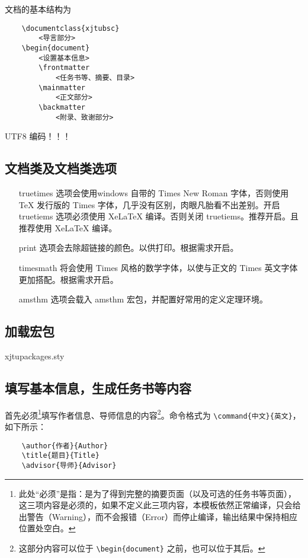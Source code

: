 \documentclass[%
               amsthm,
              ]{xjtubsc}
\begin{document}
文档的基本结构为
\begin{verbatim}
    \documentclass{xjtubsc}
        <导言部分>
    \begin{document}
        <设置基本信息>
        \frontmatter
            <任务书等、摘要、目录>
        \mainmatter
            <正文部分>
        \backmatter
            <附录、致谢部分>
\end{verbatim}

UTF8 编码！！！
\subsection{文档类及文档类选项}

\begin{itemize}
\item[truetimes] 选项会使用windows 自带的 Times New Roman 字体，否则使用 TeX 发行版的 Times 字体，几乎没有区别，肉眼凡胎看不出差别。开启 truetiems 选项必须使用 XeLaTeX 编译。否则关闭 truetiems。推荐开启。且推荐使用 XeLaTeX 编译。

\item[print] 选项会去除超链接的颜色。以供打印。根据需求开启。

\item[timesmath] 将会使用 Times 风格的数学字体，以使与正文的 Times 英文字体更加搭配。根据需求开启。

\item[amsthm] 选项会载入 amsthm 宏包，并配置好常用的定义定理环境。
\end{itemize}

\subsection{加载宏包}
xjtupackages.sty

\subsection{填写基本信息，生成任务书等内容}

首先必须\footnote{此处“必须”是指：是为了得到完整的摘要页面（以及可选的任务书等页面），这三项内容是必须的，如果不定义此三项内容，本模板依然正常编译，只会给出警告（Warning），而不会报错（Error）而停止编译，输出结果中保持相应位置处空白。}填写作者信息、导师信息的内容\footnote{这部分内容可以位于 \verb+\begin{document}+ 之前，也可以位于其后。}。命令格式为 \verb|\command{中文}{英文}|，如下所示：
\begin{verbatim}
    \author{作者}{Author}
    \title{题目}{Title}
    \advisor{导师}{Advisor}
\end{verbatim}
\end{document}
